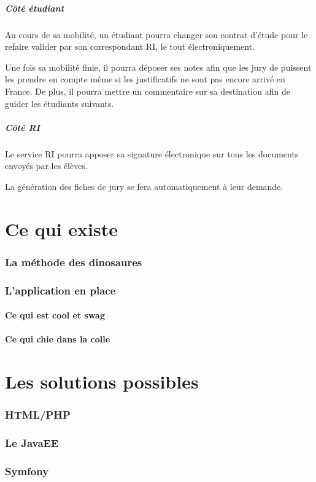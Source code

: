 \documentclass{rapport}
\begin{document}
		\subsubsection{Côté étudiant}
		
		Au cours de sa mobilité, un étudiant pourra changer son contrat d'étude pour le refaire valider par son correspondant RI, le tout électroniquement.
		
		Une fois sa mobilité finie, il pourra déposer ses notes afin que les jury de puissent les prendre en compte même si les justificatifs ne sont pas encore arrivé en France. De plus, il pourra mettre un commentaire sur sa destination afin de guider les étudiants suivants.
		
		\subsubsection{Côté RI}
		
		Le service RI pourra apposer sa signature électronique sur tous les documents envoyés par les élèves.
		
		La génération des fiches de jury se fera automatiquement à leur demande.
	
	\setcounter{section}{0}
	\part{Ce qui existe}
	
		\section{La méthode des dinosaures}
		
		\section{L'application en place}
			\subsection{Ce qui est cool et swag}
			\subsection{Ce qui chie dans la colle}
	
	\setcounter{section}{0}
	\part{Les solutions possibles}
		
		\section{HTML/PHP}
		\section{Le JavaEE}
		\section{Symfony}
		
\end{document}

